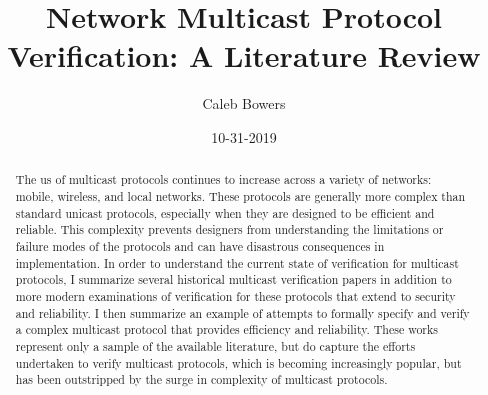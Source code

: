 \documentclass[11pt, journal]{IEEEtran}
\title{Network Multicast Protocol Verification: A Literature Review}
\author{Caleb Bowers}
\date{10-31-2019}
\begin{document}
\begin{titlingpage}
\maketitle
\begin{abstract}
The us of multicast protocols continues to increase across a variety of networks: mobile, wireless, and local networks. These protocols are generally more complex than standard unicast protocols, especially when they are designed to be efficient and reliable. This complexity prevents designers from understanding the limitations or failure modes of the protocols and can have disastrous consequences in implementation. In order to understand the current state of verification for multicast protocols, I summarize several historical multicast verification papers in addition to more modern examinations of verification for these protocols that extend to security and reliability. I then summarize an example of attempts to formally specify and verify a complex multicast protocol that provides efficiency and reliability. These works represent only a sample of the available literature, but do capture the efforts undertaken to verify multicast protocols, which is becoming increasingly popular, but has been outstripped by the surge in complexity of multicast protocols.
\end{abstract}
\end{titlingpage}

\tableofcontents
\end{document}
